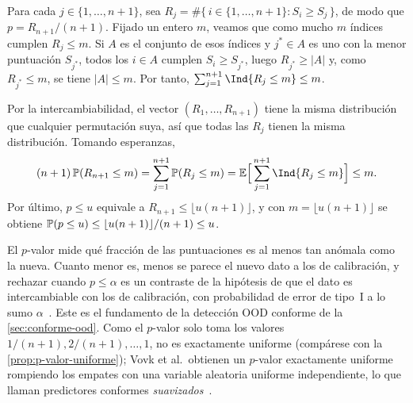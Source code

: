 \begin{demostracion}
Para cada $j \in \{1,\dots,n+1\}$, sea
$R_j = \#\{\, i \in \{1,\dots,n+1\} : S_i \ge S_j \,\}$, de modo que
$p = R_{n+1}/(n+1)$. Fijado un entero $m$, veamos que como mucho $m$ índices
cumplen $R_j \le m$. Si $A$ es el conjunto de esos índices y $j^\ast \in A$ es uno
con la menor puntuación $S_{j^\ast}$, todos los $i \in A$ cumplen
$S_i \ge S_{j^\ast}$, luego $R_{j^\ast} \ge |A|$ y, como $R_{j^\ast} \le m$, se
tiene $|A| \le m$. Por tanto,
$\sum_{j=1}^{n+1} \Ind\{R_j \le m\} \le m$.

Por la intercambiabilidad, el vector $(R_1,\dots,R_{n+1})$ tiene la misma
distribución que cualquier permutación suya, así que todas las $R_j$ tienen la
misma distribución. Tomando esperanzas,
\[
  (n+1)\,\Prob(R_{n+1} \le m) = \sum_{j=1}^{n+1} \Prob(R_j \le m)
  = \E\Bigl[\,\sum_{j=1}^{n+1} \Ind\{R_j \le m\}\Bigr] \le m .
\]
Por último, $p \le u$ equivale a $R_{n+1} \le \lfloor u(n+1) \rfloor$, y con
$m = \lfloor u(n+1) \rfloor$ se obtiene
$\mathbb{P}(p \le u) \le \lfloor u(n+1)\rfloor/(n+1) \le u$.
\end{demostracion}

El $p$-valor mide qué fracción de las puntuaciones es al menos tan anómala como la
nueva. Cuanto menor es, menos se parece el nuevo dato a los de calibración, y
rechazar cuando $p \le \alpha$ es un contraste de la hipótesis de que el dato es
intercambiable con los de calibración, con probabilidad de error de tipo~I a lo
sumo $\alpha$~\cite{angelopoulos2021,vovk2022}. Este es el fundamento de la
detección OOD conforme de la \cref{sec:conforme-ood}. Como el $p$-valor solo toma los
valores $1/(n+1), 2/(n+1), \dots, 1$, no es exactamente uniforme (compárese con la
\cref{prop:p-valor-uniforme}); Vovk et al.\ obtienen un $p$-valor exactamente
uniforme rompiendo los empates con una variable aleatoria uniforme
independiente, lo que llaman predictores conformes
\emph{suavizados}~\cite{vovk2022}.

